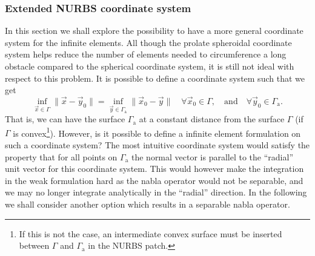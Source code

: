 \subsubsection{Extended NURBS coordinate system}
\label{subsubsubsec:infElementsOnGeneralizedCoordSyst}
In this section we shall explore the possibility to have a more general coordinate system for the infinite elements. All though the prolate spheroidal coordinate system helps reduce the number of elements needed to circumference a long obstacle compared to the spherical coordinate system, it is still not ideal with respect to this problem. It is possible to define a coordinate system such that we get
\begin{equation*}
	\inf_{\vec{x}\in\Gamma} \| \vec{x} - \vec{y}_0 \| = \inf_{\vec{y}\in\Gamma_{\mathrm{a}}} \| \vec{x}_0-\vec{y}\|\quad \forall\vec{x}_0\in\Gamma,\quad\text{and}\quad\forall\vec{y}_0\in\Gamma_{\mathrm{a}}.
\end{equation*}
That is, we can have the surface $\Gamma_{\mathrm{a}}$ at a constant distance from the surface $\Gamma$ (if $\Gamma$ is convex\footnote{If this is not the case, an intermediate convex surface must be inserted between $\Gamma$ and $\Gamma_{\mathrm{a}}$ in the NURBS patch.}). However, is it possible to define a infinite element formulation on such a coordinate system? The most intuitive coordinate system would satisfy the property that for all points on $\Gamma_{\mathrm{a}}$ the normal vector is parallel to the ``radial'' unit vector for this coordinate system. This would however make the integration in the weak formulation hard as the nabla operator would not be separable, and we may no longer integrate analytically in the ``radial'' direction. In the following we shall consider another option which results in a separable nabla operator.

